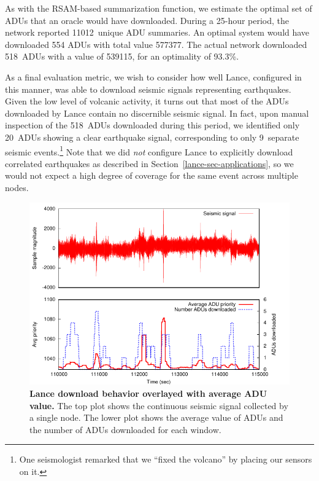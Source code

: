 
As with the RSAM-based summarization function, we estimate the optimal set of
ADUs that an oracle would have downloaded. During a 25-hour period, the
network reported 11012~unique ADU summaries. An optimal system would have
downloaded 554 ADUs with total value 577377.  The actual network
downloaded 518~ADUs with a value of 539115, for an optimality of 93.3\%. 


As a final evaluation metric, we wish to consider how well Lance,
configured in this manner, was able to download seismic signals
representing earthquakes. Given the low level of volcanic activity, 
it turns out that most of the ADUs downloaded by Lance contain no 
discernible seismic signal. In fact, upon manual inspection of the
518~ADUs downloaded during this period, we identified only 20~ADUs
showing a clear earthquake signal, corresponding to only 9~separate
seismic events.\footnote{One seismologist remarked that we 
``fixed the volcano'' by placing our sensors on it.}
Note that we did {\em not} configure Lance to explicitly download 
correlated earthquakes as described in Section~\ref{lance-sec-applications},
so we would not expect a high degree of coverage for the same event
across multiple nodes.

\begin{figure}[t]
\label{lance-fig-downloads-cont}
\begin{center}
\includegraphics[width=1.0\hsize]{./6-lance/figs/deploy/deploydownloads/everything.pdf}
\end{center}
\caption{\textbf{Lance download behavior overlayed with average ADU value.}
The top plot shows the continuous seismic signal collected by a single node.
The lower plot shows the average value of ADUs and the number of ADUs
downloaded for each window.}
\end{figure}

